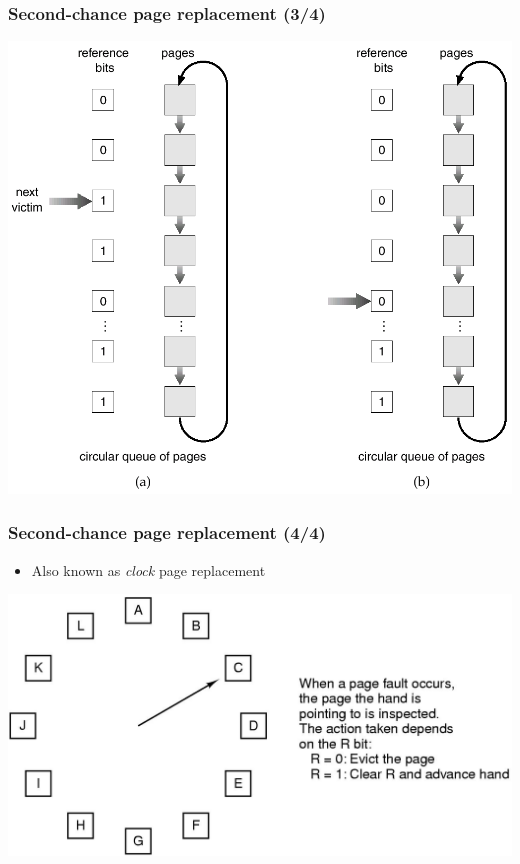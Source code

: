 \documentclass[CJKutf8,xcolor=pdftex,dvipsnames,table]{beamer}
\begin{document}
\begin{CJK*}{UTF8}{song}
  \begin{frame}
    \frametitle{Second-chance page replacement (3/4)} \pause
    \begin{center}
      \includegraphics[scale=0.3]{v6f10-14}
    \end{center}
  \end{frame}
  
  \begin{frame}
    \frametitle{Second-chance page replacement (4/4)} \pause
    \begin{itemize}
    \item{Also known as {\em clock} page replacement} \pause
    \end{itemize}
    \begin{center}
      \includegraphics[scale=0.25]{mosv2f4-17}
    \end{center}
  \end{frame}
  

\end{CJK*}
\end{document}

